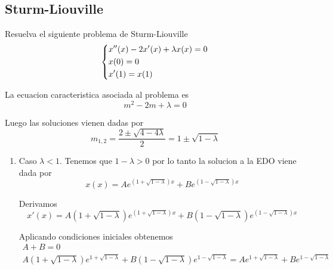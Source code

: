 \message{ !name(MAT024.tex)}\documentclass[../main.tex]{subfiles}
\begin{document}
\subsection{Sturm-Liouville}
\begin{problem}
  Resuelva el siguiente problema de Sturm-Liouville
  \begin{equation*}
    \begin{dcases}
      x''(x) - 2x'(x) + \lambda x(x) = 0\\
      x(0) = 0\\
      x'(1) = x(1)
    \end{dcases}
  \end{equation*}
\end{problem}
\begin{solution}
    La ecuacion caracteristica asociada al problema es
    \begin{equation*}
      m^{2} - 2m + \lambda = 0
    \end{equation*}

    Luego las soluciones vienen dadas por
    \begin{equation*}
      m_{1,2} = \frac{2 \pm \sqrt{4 - 4\lambda}}{2} = 1 \pm \sqrt{1 - \lambda}
    \end{equation*}

    \begin{enumerate}
      \item Caso $\lambda < 1$. Tenemos que $1 - \lambda > 0$ por lo tanto la solucion a la EDO
            viene dada por
            \begin{equation*}
              x(x) = Ae^{(1 + \sqrt{1 - \lambda})x} + B e^{(1 - \sqrt{1 - \lambda})x}
            \end{equation*}

            Derivamos
            \begin{equation*}
              x'(x) = A(1 + \sqrt{1 - \lambda})e^{(1 + \sqrt{1 - \lambda})x} + B(1 - \sqrt{1 - \lambda})e^{(1 - \sqrt{1 - \lambda})x}
            \end{equation*}

            Aplicando condiciones iniciales obtenemos
            \begin{gather*}
              A + B = 0\\
              A(1 + \sqrt{1 - \lambda})e^{1 + \sqrt{1 - \lambda}} + B(1 - \sqrt{1 - \lambda})e^{1 - \sqrt{1 - \lambda}} = Ae^{1 + \sqrt{1 - \lambda}} + Be^{1 - \sqrt{1 - \lambda}}
            \end{gather*}


\end{enumerate}
\end{solution}
\end{document}
